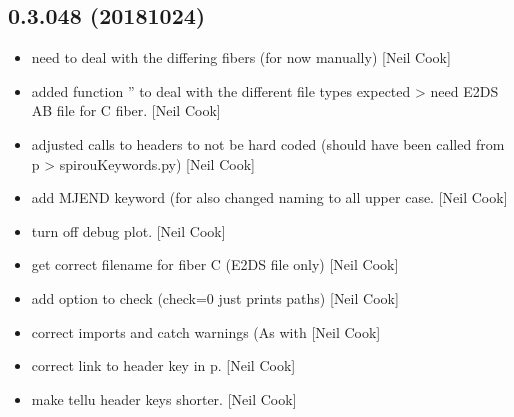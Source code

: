 \documentclass[a4paper,10pt,english]{report}
\begin{document}
\subsection{0.3.048 (2018\sphinxhyphen{}10\sphinxhyphen{}24)}
\label{\detokenize{misc/changelog:id303}}\begin{itemize}
\item {} 
 \sphinxhyphen{} need to deal with the differing fibers (for now
manually) {[}Neil Cook{]}

\item {} 
 \sphinxhyphen{} added function ” to deal with the
different file types expected \textendash{}\textgreater{} need E2DS AB file for C fiber. {[}Neil
Cook{]}

\item {} 
 \sphinxhyphen{} adjusted calls to headers to not be hard coded
(should have been called from p \textendash{}\textgreater{} spirouKeywords.py) {[}Neil Cook{]}

\item {} 
 \sphinxhyphen{} add MJEND keyword (for  \sphinxhyphen{} also
changed naming to all upper case. {[}Neil Cook{]}

\item {} 
 \sphinxhyphen{} turn off debug plot. {[}Neil Cook{]}

\item {} 
 \sphinxhyphen{} get correct filename for fiber C (E2DS
file only) {[}Neil Cook{]}

\item {} 
 \sphinxhyphen{} add option to check (check=0 just prints
paths) {[}Neil Cook{]}

\item {} 
 \sphinxhyphen{} correct imports and catch warnings (As
with  {[}Neil Cook{]}

\item {} 
 \sphinxhyphen{} correct link to header key in p. {[}Neil
Cook{]}

\item {} 
 \sphinxhyphen{} make tellu header keys shorter. {[}Neil Cook{]}


\end{itemize}
\end{document}
